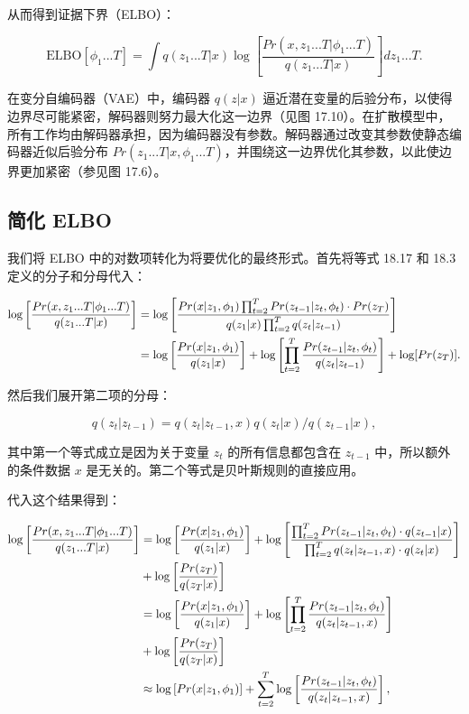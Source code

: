 \documentclass[lang=cn,newtx,10pt,scheme=chinese]{elegantbook}
\begin{document}
从而得到证据下界（ELBO）：

\begin{equation}
\text{ELBO}[\phi_1...T] = \int q(z_1...T|x) \log \left[ \frac{Pr(x, z_1...T|\phi_1...T)}{q(z_1...T|x)} \right] dz_1...T. 
\end{equation}

在变分自编码器（VAE）中，编码器 \(q(z|x)\) 逼近潜在变量的后验分布，以使得边界尽可能紧密，解码器则努力最大化这一边界（见图 17.10）。在扩散模型中，所有工作均由解码器承担，因为编码器没有参数。解码器通过改变其参数使静态编码器近似后验分布 \(Pr(z_1...T|x, \phi_1...T)\)，并围绕这一边界优化其参数，以此使边界更加紧密（参见图 17.6）。


\subsection{简化 ELBO}
我们将 ELBO 中的对数项转化为将要优化的最终形式。首先将等式 18.17 和 18.3 定义的分子和分母代入：


\begin{align}
\log \left[ \frac{Pr(x, z_1...T|\phi_1...T)}{q(z_1...T|x)} \right] &= \log \left[ \frac{Pr(x|z_1, \phi_1) \prod_{t=2}^{T} Pr(z_{t-1}|z_t, \phi_t) \cdot Pr(z_T)}{q(z_1|x) \prod_{t=2}^{T} q(z_t|z_{t-1})} \right] \notag \\
&= \log \left[ \frac{Pr(x|z_1, \phi_1)}{q(z_1|x)} \right] + \log \left[ \prod_{t=2}^{T} \frac{Pr(z_{t-1}|z_t, \phi_t)}{q(z_t|z_{t-1})} \right] + \log [ Pr(z_T) ]. 
\end{align} 


然后我们展开第二项的分母：

\begin{equation}
q(z_t|z_{t-1}) = q(z_t|z_{t-1}, x)q(z_t|x) / q(z_{t-1}|x), 
\end{equation}

其中第一个等式成立是因为关于变量 \(z_t\) 的所有信息都包含在 \(z_{t-1}\) 中，所以额外的条件数据 \(x\) 是无关的。第二个等式是贝叶斯规则的直接应用。

代入这个结果得到：

\begin{align}
\log \left[ \frac{Pr(x, z_1...T|\phi_1...T)}{q(z_1...T|x)} \right] &= \log \left[ \frac{Pr(x|z_1, \phi_1)}{q(z_1|x)} \right] + \log \left[ \frac{\prod_{t=2}^{T} Pr(z_{t-1}|z_t, \phi_t) \cdot q(z_{t-1}|x)}{\prod_{t=2}^{T} q(z_t|z_{t-1}, x) \cdot q(z_t|x)} \right] \notag \\
&+ \log \left[ \frac{Pr(z_T)}{q(z_T|x)} \right]  \notag \\
&= \log \left[ \frac{Pr(x|z_1, \phi_1)}{q(z_1|x)} \right] + \log \left[ \prod_{t=2}^{T} \frac{Pr(z_{t-1}|z_t, \phi_t)}{q(z_t|z_{t-1}, x)} \right] \notag \\ 
&+ \log \left[ \frac{Pr(z_T)}{q(z_T|x)} \right]  \notag \\
&\approx \log \left[ Pr(x|z_1, \phi_1) \right] + \sum_{t=2}^{T} \log \left[ \frac{Pr(z_{t-1}|z_t, \phi_t)}{q(z_t|z_{t-1}, x)} \right], 
\end{align} 
\end{document}
